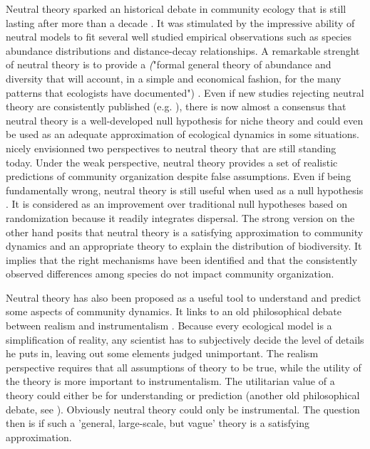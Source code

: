 \documentclass[12pt]{article}
\begin{document}
Neutral theory sparked an historical debate in community ecology that is still lasting after more than a decade \parencite{Chave2004, Etiennee2011, Rosindell2012,Clark2012}. It was stimulated by the impressive ability of neutral models to fit several well studied empirical observations such as species abundance distributions and distance-decay relationships. A remarkable strenght of neutral theory is to provide a \textit("formal general theory of abundance and diversity that will account, in a simple and economical fashion, for the many patterns that ecologists have documented") \parencite{Bell2001}. Even if new studies rejecting neutral theory are consistently published (e.g. \textcite{Ricklefs2012}), there is now almost a consensus that neutral theory is a well-developed null hypothesis for niche theory and could even be used as an adequate approximation of ecological dynamics in some situations. \textcite{Bell2001} nicely envisionned two perspectives to neutral theory that are still standing today. Under the weak perspective, neutral theory provides a set of realistic predictions of community organization despite false assumptions. Even if being fundamentally wrong, neutral theory is still useful when used as a null hypothesis \parencite{Gotelli2006}. It is considered as an improvement over traditional null hypotheses based on randomization \parencite{Gotelli2000} because it readily integrates dispersal. The strong version on the other hand posits that neutral theory is a satisfying approximation to community dynamics and an appropriate theory to explain the distribution of biodiversity. It implies that the right mechanisms have been identified and that the consistently observed differences among species do not impact community organization. 

Neutral theory has also been proposed as a useful tool to understand and predict some aspects of community dynamics. It links to an old philosophical debate between realism and instrumentalism \parencite{Wennekes2011}. Because every ecological model is a simplification of reality, any scientist has to subjectively decide the level of details he puts in, leaving out some elements judged unimportant. The realism perspective requires that all assumptions of theory to be true, while the utility of the theory is more important to instrumentalism. The utilitarian value of a theory could either be for understanding or prediction (another old philosophical debate, see \textcite{Schmueli2010}). Obviously neutral theory could only be instrumental. The question then is if such a 'general, large-scale, but vague' theory \parencite{Wennekes2011} is a satisfying approximation. 
\end{document}
